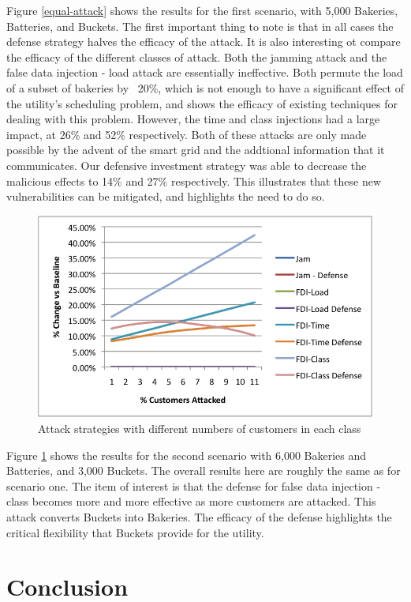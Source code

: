\documentclass[conference]{IEEEtran}
\begin{document}
Figure \ref{equal-attack} shows the results for the first scenario, with 5,000 Bakeries, Batteries, and Buckets.  The first important thing to note is that in all cases the defense strategy halves the efficacy of the attack.  It is also interesting ot compare the efficacy of the different classes of attack.  Both the jamming attack and the false data injection - load attack are essentially ineffective.  Both permute the load of a subset of bakeries by ~20\%, which is not enough to have a significant effect of the utility's scheduling problem, and shows the efficacy of existing techniques for dealing with this problem.  However, the time and class injections had a large impact, at 26\% and 52\% respectively.  Both of these attacks are only made possible by the advent of the smart grid and the addtional information that it communicates.  Our defensive investment strategy was able to decrease the malicious effects to 14\% and 27\% respectively.  This illustrates that these new vulnerabilities can be mitigated, and highlights the need to do so.

\begin{figure}[!htbp]
\centering
\includegraphics[width=.5\textwidth]{unequal-attacks.png}
\caption{Attack strategies with different numbers of customers in each class}
\label{unequal-attack}
\end{figure}

Figure \ref{unequal-attack} shows the results for the second scenario with 6,000 Bakeries and Batteries, and 3,000 Buckets.  The overall results here are roughly the same as for scenario one.  The item of interest is that the defense for false data injection - class becomes more and more effective as more customers are attacked.  This attack converts Buckets into Bakeries.  The efficacy of the defense highlights the critical flexibility that Buckets provide for the utility.


\section{Conclusion}
\label{Conclusion}
\end{document}
